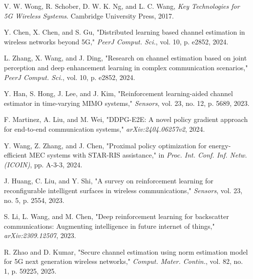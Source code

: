 \documentclass[journal,twocolumn]{IEEEtran}
\begin{document}
\begin{thebibliography}{20}

V. W. Wong, R. Schober, D. W. K. Ng, and L. C. Wang, \emph{Key Technologies for 5G Wireless Systems}. Cambridge University Press, 2017.

Y. Chen, X. Chen, and S. Gu, "Distributed learning based channel estimation in wireless networks beyond 5G," \emph{PeerJ Comput. Sci.}, vol. 10, p. e2852, 2024.

L. Zhang, X. Wang, and J. Ding, "Research on channel estimation based on joint perception and deep enhancement learning in complex communication scenarios," \emph{PeerJ Comput. Sci.}, vol. 10, p. e2852, 2024.

Y. Han, S. Hong, J. Lee, and J. Kim, "Reinforcement learning-aided channel estimator in time-varying MIMO systems," \emph{Sensors}, vol. 23, no. 12, p. 5689, 2023.

F. Martinez, A. Liu, and M. Wei, "DDPG-E2E: A novel policy gradient approach for end-to-end communication systems," \emph{arXiv:2404.06257v2}, 2024.

Y. Wang, Z. Zhang, and J. Chen, "Proximal policy optimization for energy-efficient MEC systems with STAR-RIS assistance," in \emph{Proc. Int. Conf. Inf. Netw. (ICOIN)}, pp. A-3-3, 2024.

J. Huang, C. Liu, and Y. Shi, "A survey on reinforcement learning for reconfigurable intelligent surfaces in wireless communications," \emph{Sensors}, vol. 23, no. 5, p. 2554, 2023.

S. Li, L. Wang, and M. Chen, "Deep reinforcement learning for backscatter communications: Augmenting intelligence in future internet of things," \emph{arXiv:2309.12507}, 2023.

R. Zhao and D. Kumar, "Secure channel estimation using norm estimation model for 5G next generation wireless networks," \emph{Comput. Mater. Contin.}, vol. 82, no. 1, p. 59225, 2025.


\end{thebibliography}
\end{document}
